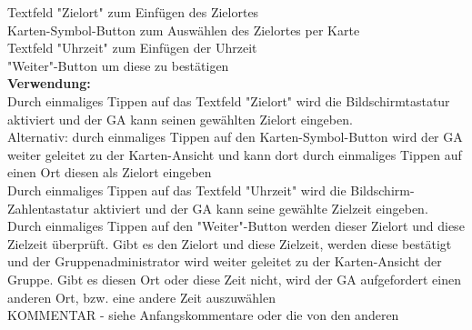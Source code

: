 Textfeld "Zielort" zum Einfügen des Zielortes\\
Karten-Symbol-Button zum Auswählen des Zielortes per Karte\\
Textfeld "Uhrzeit" zum Einfügen der Uhrzeit\\
"Weiter"-Button um diese zu bestätigen\\
\textbf{Verwendung:}\\
Durch einmaliges Tippen auf das Textfeld "Zielort" wird die Bildschirmtastatur aktiviert und der GA kann seinen gewählten Zielort eingeben.\\
Alternativ: durch einmaliges Tippen auf den Karten-Symbol-Button wird der GA weiter geleitet zu der Karten-Ansicht und kann dort durch einmaliges Tippen auf einen Ort diesen als Zielort eingeben\\
Durch einmaliges Tippen auf das Textfeld "Uhrzeit" wird die Bildschirm-Zahlentastatur aktiviert und der GA kann seine gewählte Zielzeit eingeben.\\
Durch einmaliges Tippen auf den "Weiter"-Button werden dieser Zielort und diese Zielzeit überprüft. Gibt es den Zielort und diese Zielzeit, werden diese bestätigt und der Gruppenadministrator wird weiter geleitet zu der Karten-Ansicht der Gruppe. Gibt es diesen Ort oder diese Zeit nicht, wird der GA aufgefordert einen anderen Ort, bzw. eine andere Zeit auszuwählen\\

KOMMENTAR
- siehe Anfangskommentare oder die von den anderen 



